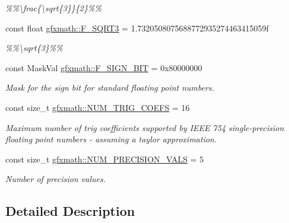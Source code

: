 \begin{DoxyCompactItemize}
\begin{DoxyCompactList}\small\item\em \%\%\textbackslash{}frac\{\textbackslash{}sqrt\{3\}\}\{2\}\%\% \end{DoxyCompactList}\item 
\hypertarget{group___scalar_math_consts_ga1e7def1903a3d92805ba4ed841ee1bbf}{}const float \hyperlink{group___scalar_math_consts_ga1e7def1903a3d92805ba4ed841ee1bbf}{gfxmath\+::\+F\+\_\+\+S\+Q\+R\+T3} = 1.\+7320508075688772935274463415059f\label{group___scalar_math_consts_ga1e7def1903a3d92805ba4ed841ee1bbf}

\begin{DoxyCompactList}\small\item\em \%\%\textbackslash{}sqrt\{3\}\%\% \end{DoxyCompactList}\item 
const Mask\+Val \hyperlink{group___scalar_math_consts_gad2489c06f986e5af29bfb5c2eaca185f}{gfxmath\+::\+F\+\_\+\+S\+I\+G\+N\+\_\+\+B\+I\+T} = 0x80000000
\begin{DoxyCompactList}\small\item\em Mask for the sign bit for standard floating point numbers. \end{DoxyCompactList}\item 
const size\+\_\+t \hyperlink{group___scalar_math_consts_ga090f5a34fbed01148a6f72dc1abb00e9}{gfxmath\+::\+N\+U\+M\+\_\+\+T\+R\+I\+G\+\_\+\+C\+O\+E\+F\+S} = 16
\begin{DoxyCompactList}\small\item\em Maximum number of trig coefficients supported by I\+E\+E\+E 754 single-\/precision floating point numbers -\/ assuming a taylor approximation. \end{DoxyCompactList}\item 
\hypertarget{group___scalar_math_consts_ga2b78b41d32d14485b997dada705037bb}{}const size\+\_\+t \hyperlink{group___scalar_math_consts_ga2b78b41d32d14485b997dada705037bb}{gfxmath\+::\+N\+U\+M\+\_\+\+P\+R\+E\+C\+I\+S\+I\+O\+N\+\_\+\+V\+A\+L\+S} = 5\label{group___scalar_math_consts_ga2b78b41d32d14485b997dada705037bb}

\begin{DoxyCompactList}\small\item\em Number of precision values. \end{DoxyCompactList}\end{DoxyCompactItemize}


\subsection{Detailed Description}


